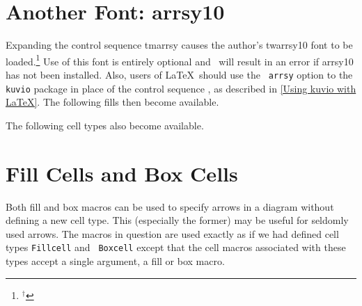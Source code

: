 \section{Another Font: arrsy10}
\label{Another Font: arrsy10}

Expanding the control sequence \index tm{arrsy}
causes the author's \index tw{arrsy10} font to be
loaded.\footnote{$^\dagger$}%
{Use of this font is entirely optional and \csq\arrsy\ will result in an error
if arrsy10 has not been installed. Also, users of \LaTeX\ should use the {\tt
arrsy} option to the {\tt kuvio} package in place of the control sequence
\csq\arrsy, as described in \ref{Using kuvio with LaTeX}.}
The following fills then become available.

\null{\parskip=0pt\parindent=25pt
\testfill\Rightharpoonupfill
\testfill\Rightharpoondownfill
\testfill\Rrightarrowfill
\testfill\equivfill
\testfill\dashfill
\testfill\rightdashfill
\testfill\rightepifill
\testfill\rightmonofill
\testfill\rightmonotailfill
\testfill\rightisofill
\testfill\rightdashmonofill
\testfill\rightdashmonotailfill
\testfill\rightdashepifill
\testfill\rightdashisofill
\testfill\squigglefill
}

The following cell types also become available.


\section{Fill Cells and Box Cells}

Both fill and box macros can be used to specify arrows in a diagram
without defining a new cell type.  This (especially the former) may be
useful for seldomly used arrows.  The macros in question are used
exactly as if we had defined cell types {\tt Fillcell} and {\tt
Boxcell} except that the cell macros associated with these types
accept a single argument, a fill or box macro.

